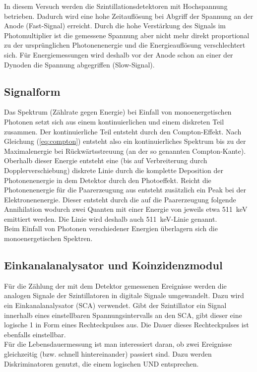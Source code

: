 In diesem Versuch werden die Szintillationsdetektoren mit Hochspannung betrieben. Dadurch wird eine hohe Zeitauflösung bei Abgriff der Spannung an der Anode (Fast-Signal) erreicht. Durch die hohe Verstärkung des Signals im Photomultiplier ist die gemessene Spannung aber nicht mehr direkt proportional zu der ursprünglichen Photonenenergie und die Energieauflösung verschlechtert sich. Für Energiemessungen wird deshalb vor der Anode schon an einer der Dynoden die Spannung abgegriffen (Slow-Signal).

\subsection{Signalform}
Das Spektrum (Zählrate gegen Energie) bei Einfall von monoenergetischen Photonen setzt sich aus einem kontinuierlichen und einem diskreten Teil zusammen. Der kontinuierliche Teil entsteht durch den Compton-Effekt. Nach Gleichung (\ref{eq:compton}) entsteht also ein kontinuierliches Spektrum bis zu der Maximalenergie bei Rückwärtsstreuung (an der so genannten Compton-Kante). Oberhalb dieser Energie entsteht eine (bis auf Verbreiterung durch Dopplerverschiebung) diskrete Linie durch die komplette Deposition der Photonenenergie in dem Detektor durch den Photoeffekt. Reicht die Photonenenergie für die Paarerzeugung aus entsteht zusätzlich ein Peak bei der Elektronenenergie. Dieser entsteht durch die auf die Paarerzeugung folgende Annihilation wodurch zwei Quanten mit einer Energie von jeweils etwa \SI{511}{\kilo\electronvolt} emittiert werden. Die Linie wird deshalb auch \SI{511}{\kilo\electronvolt}-Linie genannt. \\

Beim Einfall von Photonen verschiedener Energien überlagern sich die monoenergetischen Spektren.

\subsection{Einkanalanalysator und Koinzidenzmodul}
Für die Zählung der mit dem Detektor gemessenen Ereignisse werden die analogen Signale der Szintillatoren in digitale Signale umgewandelt. Dazu wird ein Einkanalanalysator (SCA) verwendet. Gibt der Szintillator ein Signal innerhalb eines einstellbaren Spannungsintervalls an den SCA, gibt dieser eine logische 1 in Form eines Rechteckpulses aus. Die Dauer dieses Rechteckpulses ist ebenfalls einstellbar.\\

Für die Lebensdauermessung ist man interessiert daran, ob zwei Ereignisse gleichzeitig (bzw. schnell hintereinander) passiert sind. Dazu werden Diskriminatoren genutzt, die einem logischen UND entsprechen.


